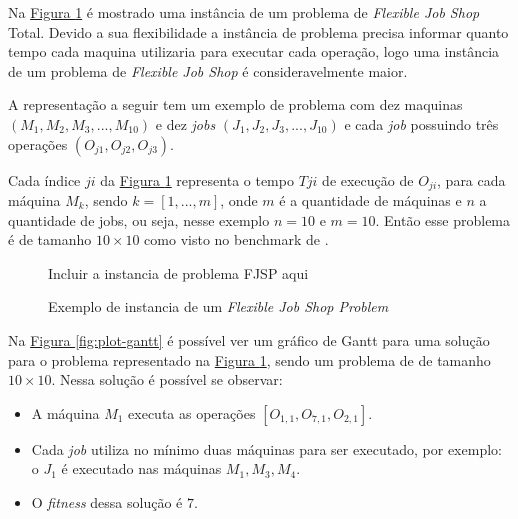             Na 
            \hyperref[fig:ex-instancia-problema-FJSP]{Figura \ref{fig:ex-instancia-problema-FJSP}} 
            é mostrado uma instância de um problema de \textit{Flexible Job Shop} Total. Devido a sua flexibilidade a instância de problema precisa informar quanto tempo cada maquina utilizaria para executar cada operação, logo uma instância de um problema de \textit{Flexible Job Shop} é consideravelmente maior.\newline

            A representação a seguir tem um exemplo de problema com dez maquinas $(M_1, M_2, M_3, ..., M_{10})$ e dez \textit{jobs} $(J_1, J_2, J_3, ..., J_{10})$ e cada \textit{job} possuindo três operações $(O_{j1}, O_{j2}, O_{j3})$.\newline

            Cada índice $ji$ da 
            \hyperref[fig:ex-instancia-problema-FJSP]{Figura \ref{fig:ex-instancia-problema-FJSP}} 
            representa o tempo $T{ji}$ de execução de $O_{ji}$, para cada máquina $M_k$, 
            sendo $k=[1, ..., m]$, onde $m$ é a quantidade de máquinas e $n$ a quantidade de jobs, ou seja, nesse exemplo $n=10$ e $m=10$.\newline
            Então esse problema é de tamanho $10\times10$ como visto no benchmark de \cite{Kacem2002}.\newline

            \begin{figure}[ht]
                \centering
                \small{Incluir a instancia de problema FJSP aqui}
                \caption{Exemplo de instancia de um \textit{Flexible Job Shop Problem}}
                \label{fig:ex-instancia-problema-FJSP}
            \end{figure}



            Na 
            \hyperref[fig:plot-gantt]{Figura \ref{fig:plot-gantt}} 
            é possível ver um gráfico de Gantt para uma solução para o problema representado na 
            \hyperref[fig:ex-instancia-problema-FJSP]{Figura \ref{fig:ex-instancia-problema-FJSP}}, 
            sendo um problema de \cite{Kacem2002} de tamanho $10\times10$. Nessa solução é possível se observar:
            \begin{itemize}
                \item A máquina $M_1$ executa as operações $[O_{1,1}, O_{7,1}, O_{2,1}]$.
                \item Cada \textit{job} utiliza no mínimo duas máquinas para ser executado, por exemplo: o $J_1$ é executado nas máquinas $M_1 , M_3, M_4$.
                \item O \textit{fitness} dessa solução é $7$.
            \end{itemize}
            
